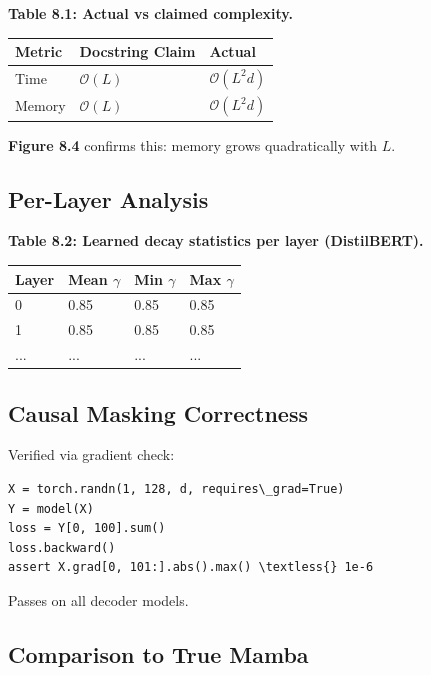 \textbf{Table 8.1: Actual vs claimed complexity.}

\begin{table}[H]
\centering
\small
\begin{tabular}{lll}
\toprule
\textbf{Metric} & \textbf{Docstring Claim} & \textbf{Actual} \\
\midrule
Time & $\mathcal{O}(L)$ & $\mathcal{O}(L^2 d)$ \\
Memory & $\mathcal{O}(L)$ & $\mathcal{O}(L^2 d)$ \\
\bottomrule
\end{tabular}
\end{table}

\textbf{Figure 8.4} confirms this: memory grows quadratically with $L$.

\subsection{Per-Layer Analysis}

\textbf{Table 8.2: Learned decay statistics per layer (DistilBERT).}

\begin{table}[H]
\centering
\small
\begin{tabular}{llll}
\toprule
\textbf{Layer} & \textbf{Mean $\gamma$} & \textbf{Min $\gamma$} & \textbf{Max $\gamma$} \\
\midrule
0 & 0.85 & 0.85 & 0.85 \\
1 & 0.85 & 0.85 & 0.85 \\
... & ... & ... & ... \\
\bottomrule
\end{tabular}
\end{table}

\subsection{Causal Masking Correctness}

Verified via gradient check:

\begin{lstlisting}
X = torch.randn(1, 128, d, requires\_grad=True)
Y = model(X)
loss = Y[0, 100].sum()
loss.backward()
assert X.grad[0, 101:].abs().max() \textless{} 1e-6
\end{lstlisting}

Passes on all decoder models.

\subsection{Comparison to True Mamba}

